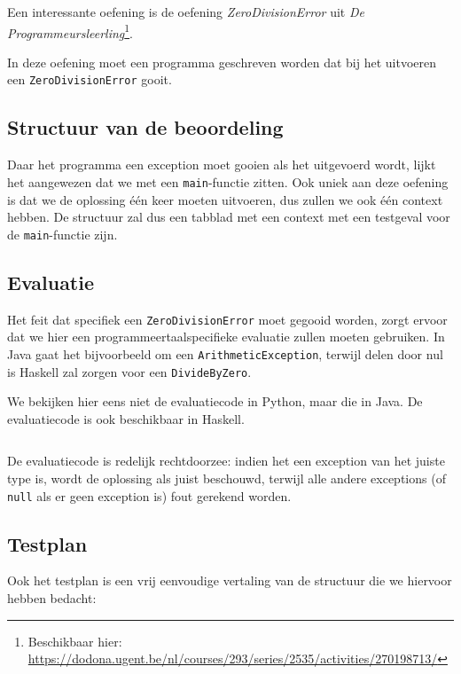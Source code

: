 Een interessante oefening is de oefening \emph{ZeroDivisionError} uit \emph{De Programmeursleerling}\footnote{Beschikbaar hier: \url{https://dodona.ugent.be/nl/courses/293/series/2535/activities/270198713/}}.

In deze oefening moet een programma geschreven worden dat bij het uitvoeren een \texttt{ZeroDivisionError} gooit.

\subsection{Structuur van de beoordeling}\label{subsec:oefening-zero-structuur}

Daar het programma een exception moet gooien als het uitgevoerd wordt, lijkt het aangewezen dat we met een \texttt{main}-functie zitten.
Ook uniek aan deze oefening is dat we de oplossing één keer moeten uitvoeren, dus zullen we ook één context hebben.
De structuur zal dus een tabblad met een context met een testgeval voor de \texttt{main}-functie zijn.

\subsection{Evaluatie}\label{subsec:oefening-zero-evaluatie}

Het feit dat specifiek een \texttt{ZeroDivisionError} moet gegooid worden, zorgt ervoor dat we hier een programmeertaalspecifieke evaluatie zullen moeten gebruiken.
In Java gaat het bijvoorbeeld om een \texttt{ArithmeticException}, terwijl delen door nul is Haskell zal zorgen voor een \texttt{DivideByZero}.

We bekijken hier eens niet de evaluatiecode in Python, maar die in Java.
De evaluatiecode is ook beschikbaar in Haskell.

\inputminted{java}{sources/division-evaluator.java}

De evaluatiecode is redelijk rechtdoorzee: indien het een exception van het juiste type is, wordt de oplossing als juist beschouwd, terwijl alle andere exceptions (of \texttt{null} als er geen exception is) fout gerekend worden.

\subsection{Testplan}\label{subsec:oefening-zero-testplan}

Ook het testplan is een vrij eenvoudige vertaling van de structuur die we hiervoor hebben bedacht:


